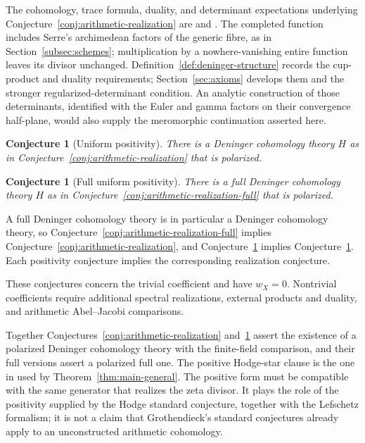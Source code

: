 \documentclass[11pt]{amsart}
\theoremstyle{plain}
\newtheorem{conjecture}[theorem]{Conjecture}
\theoremstyle{definition}
\theoremstyle{remark}
\numberwithin{equation}{section}
\begin{document}
The cohomology, trace formula, duality, and determinant expectations
underlying Conjecture~\ref{conj:arithmetic-realization} are
\cite[Conjecture~2, p.~3]{Deninger2010HilbertPolya} and
\cite[Conjecture~2.3(i)--(iii), p.~522]
{FlachMorin2020DeningerWeilArakelov}. The completed function includes
Serre's archimedean factors of the generic fibre, as in
Section~\ref{subsec:schemes}; multiplication by a nowhere-vanishing
entire function
leaves its divisor unchanged.
Definition~\ref{def:deninger-structure} records the cup-product and
duality requirements; Section~\ref{sec:axioms} develops them and the
stronger regularized-determinant condition.
 An analytic
construction of those determinants, identified with the Euler and
gamma factors on their convergence half-plane, would also supply the
meromorphic continuation asserted here.

\begin{conjecture}[Uniform positivity]
\label{conj:arithmetic-positivity}
There is a Deninger cohomology theory $H$ as in
Conjecture~\ref{conj:arithmetic-realization} that is polarized.
\end{conjecture}

\begin{conjecture}[Full uniform positivity]
\label{conj:arithmetic-positivity-full}
There is a full Deninger cohomology theory $H$ as in
Conjecture~\ref{conj:arithmetic-realization-full} that is polarized.
\end{conjecture}

A full Deninger cohomology theory is in particular a Deninger
cohomology theory, so
Conjecture~\ref{conj:arithmetic-realization-full} implies
Conjecture~\ref{conj:arithmetic-realization}, and
Conjecture~\ref{conj:arithmetic-positivity-full} implies
Conjecture~\ref{conj:arithmetic-positivity}. Each positivity
conjecture implies the corresponding realization conjecture.


These conjectures concern the trivial coefficient and have $w_X=0$.
Nontrivial coefficients require additional spectral realizations,
external products and duality, and arithmetic Abel--Jacobi comparisons.


Together Conjectures~\ref{conj:arithmetic-realization}
and~\ref{conj:arithmetic-positivity} assert the existence of a
polarized Deninger cohomology theory with the finite-field comparison,
and their full versions assert a polarized full one.
The positive Hodge-star clause is the one in
\cite[Conjecture~2.3(iv), p.~522]{FlachMorin2020DeningerWeilArakelov}
used by Theorem~\ref{thm:main-general}. The positive form must be
compatible with the same generator that realizes the zeta divisor.
It plays the role of the positivity supplied by the Hodge standard
conjecture, together with the Lefschetz formalism; it is not a claim
that Grothendieck's standard conjectures already apply to an
unconstructed arithmetic cohomology.
\end{document}
